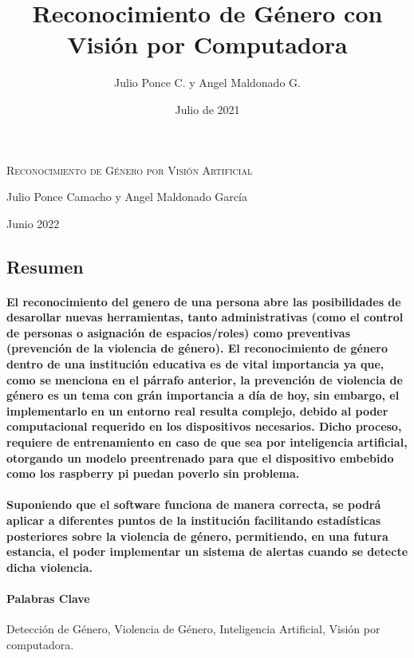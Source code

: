 \documentclass[9pt]{report}
\title{Reconocimiento de Género con Visión por Computadora}
\date{Julio de 2021}
\author{Julio Ponce C. y Angel Maldonado G.}
\begin{document}
	\begin{center}
		{\scshape\huge Reconocimiento de Género por Visión Artificial\par}
		\vspace{0.5cm}
		{\large Julio Ponce Camacho y Angel Maldonado García \par}
		{\large Junio 2022 \par}
		\vspace{0.5cm}
	\end{center}
	
	\begin{multicols}{2}
	\begin{center}
	\section*{Resumen}
	\end{center}
	\paragraph{El reconocimiento del genero de una persona abre las posibilidades de desarollar nuevas herramientas, tanto administrativas (como el control de personas o asignación de espacios/roles) como preventivas (prevención de la violencia de género). El reconocimiento de género dentro de una institución educativa es de vital importancia ya que, como se menciona en el párrafo anterior, la prevención de violencia de género es un tema con grán importancia a día de hoy, sin embargo, el implementarlo en un entorno real resulta complejo, debido al poder computacional requerido en los dispositivos necesarios. Dicho proceso, requiere de entrenamiento en caso de que sea por inteligencia artificial, otorgando un modelo preentrenado para que el dispositivo embebido como los raspberry pi puedan poverlo sin problema.}
	\paragraph{Suponiendo que el software funciona de manera correcta, se podrá aplicar a diferentes puntos de la institución facilitando estadísticas posteriores sobre la violencia de género, permitiendo, en una futura estancia, el poder implementar un sistema de alertas cuando se detecte dicha violencia.}
	\paragraph{Palabras Clave}Detección de Género, Violencia de Género, Inteligencia Artificial, Visión por computadora.
	\begin{center}

\end{center}
\end{multicols}
\end{document}
